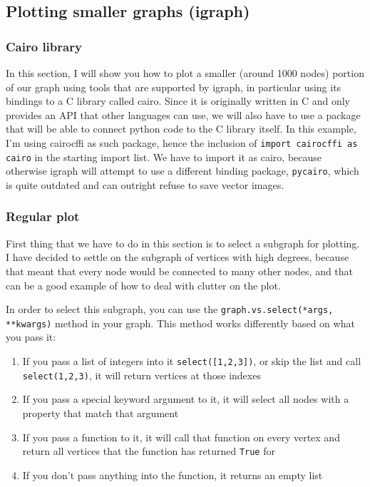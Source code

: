 \documentclass[12pt, a4paper]{article}
\begin{document}
\subsection{Plotting smaller graphs (igraph)}
\subsubsection{Cairo library}

In this section, I will show you how to plot a smaller (around 1000 nodes) portion of our graph using tools that are supported by igraph, in particular using its bindings to a C library called cairo. Since it is originally written in C and only provides an API that other languages can use, we will also have to use a package that will be able to connect python code to the C library itself. In this example, I'm using cairocffi as such package, hence the inclusion of \texttt{import cairocffi as cairo} in the starting import list. We have to import it as cairo, because otherwise igraph will attempt to use a different binding package, \texttt{pycairo}, which is quite outdated and can outright refuse to save vector images.

\subsubsection{Regular plot}

First thing that we have to do in this section is to select a subgraph for plotting. I have decided to settle on the subgraph of vertices with high degrees, because that meant that every node would be connected to many other nodes, and that can be a good example of how to deal with clutter on the plot.

In order to select this subgraph, you can use the \texttt{graph.vs.select(*args, **kwargs)} method in your graph. This method works differently based on what you pass it:\newline

\begin{enumerate}
  \item If you pass a list of integers into it \texttt{select([1,2,3])}, or skip the list and call \texttt{select(1,2,3)}, it will return vertices at those indexes
  \item If you pass a special keyword argument to it, it will select all nodes with a property that match that argument
  \item If you pass a function to it, it will call that function on every vertex and return all vertices that the function has returned \texttt{True} for
  \item If you don't pass anything into the function, it returns an empty list
\end{enumerate}
\end{document}
